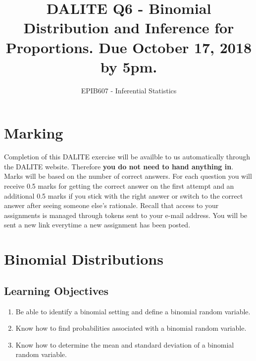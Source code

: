 \documentclass[letterpaper,9pt,twocolumn,twoside,printwatermark=false]{pinp}
\title{DALITE Q6 - Binomial Distribution and Inference for Proportions. Due
October 17, 2018 by 5pm.}
\author[a]{EPIB607 - Inferential Statistics}
\affil[a]{Fall 2018, McGill University}
\providecommand{\tightlist}{%
  \setlength{\itemsep}{0pt}\setlength{\parskip}{0pt}}
\begin{document}
\verticaladjustment{-2pt}

\maketitle
\thispagestyle{firststyle}



\section*{Marking}\label{marking}

Completion of this DALITE exercise will be availble to us automatically
through the DALITE website. Therefore \textbf{you do not need to hand
anything in}. Marks will be based on the number of correct answers. For
each question you will receive 0.5 marks for getting the correct answer
on the first attempt and an additional 0.5 marks if you stick with the
right answer or switch to the correct answer after seeing someone else's
rationale. Recall that access to your assignments is managed through
tokens sent to your e-mail address. You will be sent a new link
everytime a new assignment has been posted.

\section{Binomial Distributions}\label{binomial-distributions}

\subsection{Learning Objectives}\label{learning-objectives}

\begin{enumerate}
\def\labelenumi{\arabic{enumi}.}
\tightlist
\item
  Be able to identify a binomial setting and define a binomial random
  variable.
\item
  Know how to find probabilities associated with a binomial random
  variable.
\item
  Know how to determine the mean and standard deviation of a binomial
  random variable.
\end{enumerate}
\end{document}
